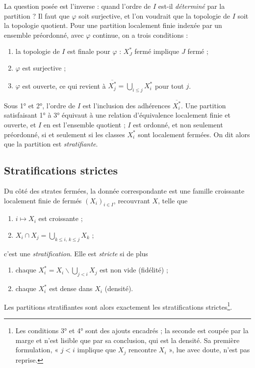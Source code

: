 \documentclass[11pt,a4paper]{article}
\begin{document}
La question posée est l'inverse : quand l'ordre de $I$ est-il \emph{déterminé} par
la partition ? Il faut que $\varphi$ soit surjective, et l'on voudrait que la
topologie de $I$ soit la topologie quotient. Pour une partition localement finie
indexée par un ensemble préordonné, avec $\varphi$ continue, on a trois
conditions :
\begin{enumerate}
\item[1°)] la topologie de $I$ est finale pour $\varphi$ : $X^{*}_J$ fermé implique
$J$ fermé ;
\item[2°)] $\varphi$ est surjective ;
\item[3°)] $\varphi$ est ouverte, ce qui revient à $\overline{X^{*}_j} =
\bigcup_{i \leq j} X^{*}_i$ pour tout $j$.
\end{enumerate}
Sous 1° et 2°, l'ordre de $I$ est l'inclusion des adhérences
$\overline{X^{*}_i}$. Une partition satisfaisant 1° à 3° équivaut à une relation
d'équivalence localement finie et ouverte, et $I$ en est l'ensemble quotient ;
$I$ est ordonné, et non seulement préordonné, si et seulement si les classes
$X^{*}_i$ sont localement fermées. On dit alors que la partition est
\emph{stratifiante}.

\subsection*{Stratifications strictes}

Du côté des strates fermées, la donnée correspondante est une famille croissante
localement finie de fermés $(X_i)_{i \in I}$, recouvrant $X$, telle que
\begin{enumerate}
\item[1°)] $i \mapsto X_i$ est croissante ;
\item[2°)] $X_i \cap X_j = \bigcup_{k \leq i,\, k \leq j} X_k$ ;
\end{enumerate}
c'est une \emph{stratification}. Elle est \emph{stricte} si de plus
\begin{enumerate}
\item[3°)] chaque $X^{*}_i = X_i \smallsetminus \bigcup_{j<i} X_j$ est non vide
(fidélité) ;
\item[4°)] chaque $X^{*}_i$ est dense dans $X_i$ (densité).
\end{enumerate}
Les partitions stratifiantes sont alors exactement les stratifications
strictes\footnote{Les conditions 3° et 4° sont des ajouts encadrés ; la seconde
est coupée par la marge et n'est lisible que par sa conclusion, qui est la
densité. Sa première formulation, « $j<i$ implique que $X_j$ rencontre $X_i$ »,
lue avec doute, n'est pas reprise.}.
\end{document}
